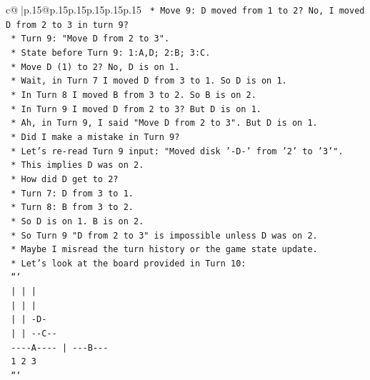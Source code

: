 \documentclass{article}
\begin{document}
{\begin{supertabular}{c@{$\;$}|p{.15\linewidth}@{}p{.15\linewidth}p{.15\linewidth}p{.15\linewidth}p{.15\linewidth}p{.15\linewidth}}
{{{\texttt{    *   Move 9: D moved from 1 to 2? No, I moved D from 2 to 3 in turn 9?} \\
\texttt{        *   Turn 9: "Move D from 2 to 3".} \\
\texttt{        *   State before Turn 9: 1:A,D; 2:B; 3:C.} \\
\texttt{        *   Move D (1) to 2? No, D is on 1.} \\
\texttt{        *   Wait, in Turn 7 I moved D from 3 to 1. So D is on 1.} \\
\texttt{        *   In Turn 8 I moved B from 3 to 2. So B is on 2.} \\
\texttt{        *   In Turn 9 I moved D from 2 to 3? But D is on 1.} \\
\texttt{        *   Ah, in Turn 9, I said "Move D from 2 to 3". But D is on 1.} \\
\texttt{        *   Did I make a mistake in Turn 9?} \\
\texttt{        *   Let's re{-}read Turn 9 input: "Moved disk '{-}D{-}' from '2' to '3'".} \\
\texttt{        *   This implies D was on 2.} \\
\texttt{        *   How did D get to 2?} \\
\texttt{        *   Turn 7: D from 3 to 1.} \\
\texttt{        *   Turn 8: B from 3 to 2.} \\
\texttt{        *   So D is on 1. B is on 2.} \\
\texttt{        *   So Turn 9 "D from 2 to 3" is impossible unless D was on 2.} \\
\texttt{        *   Maybe I misread the turn history or the game state update.} \\
\texttt{        *   Let's look at the board provided in Turn 10:} \\
\texttt{            ```} \\
\texttt{                |         |         |    } \\
\texttt{                |         |         |    } \\
\texttt{                |         |        {-}D{-}   } \\
\texttt{                |         |       {-}{-}C{-}{-}  } \\
\texttt{            {-}{-}{-}{-}A{-}{-}{-}{-}     |      {-}{-}{-}B{-}{-}{-} } \\
\texttt{                1         2         3    } \\
\texttt{            ```} \\
}}}
\end{supertabular}}
\end{document}
